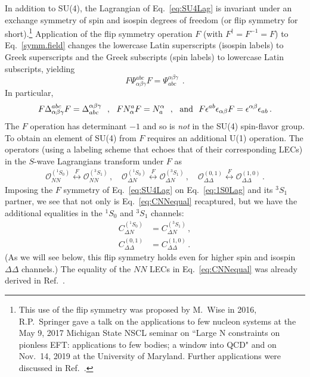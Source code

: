 \documentclass[nofootinbib, preprint, aps, prc, superscriptaddress,11pt]{revtex4-1}
\newcommand{\NN}{\ensuremath{N\!N}\xspace}
\newcommand{\oneS}{\ensuremath{{{}^{1}\!S_0}}\xspace}
\newcommand{\threeS}{\ensuremath{{{}^{3}\!S_1}}\xspace}
\newcommand\Swave{$S$-wave\xspace}
\newcommand{\calO}{\ensuremath{\mathcal{O}}}
\newcommand{\1}{\mathbbm{1}}
\newcommand{\CNDsing}{\ensuremath{C_{\Delta N}^{(^1 \! S_0)}}\xspace}
\newcommand{\CDDsing}{\ensuremath{C_{\Delta\Delta}^{(0,1)}}\xspace}
\newcommand{\ONNsing}{\ensuremath{\calO_{\NN}^{(^1 \! S_0)}}\xspace}
\newcommand{\ONDsing}{\ensuremath{\calO_{\Delta N}^{(^1 \! S_0)}}\xspace}
\newcommand{\CNDtrip}{\ensuremath{C_{\Delta N}^{(^3 \! S_1)}}\xspace}
\newcommand{\CDDtrip}{\ensuremath{C_{\Delta\Delta}^{(1,0)}}\xspace}
\newcommand{\ONNtrip}{\ensuremath{\calO_{\NN}^{(^3 \! S_1)}}\xspace}
\newcommand{\ONDtrip}{\ensuremath{\calO_{\Delta N}^{(^3 \! S_1)}}\xspace}
\newcommand{\DD}{\ensuremath{\Delta\Delta}\xspace}
\begin{document}
In addition to SU(4), the Lagrangian of Eq.~\ref{eq:SU4Lag} is invariant under an exchange symmetry of spin and isospin degrees of freedom (or flip symmetry for short).\footnote{This use of the flip symmetry was proposed by M.~Wise in 2016, R.P.~Springer gave a talk on the applications to few nucleon systems at the May 9, 2017  Michigan State NSCL seminar on ``Large N constraints on pionless EFT: applications to few bodies;
a window into QCD" and on Nov.~14, 2019 at  the University of Maryland.  Further applications were discussed in Ref.~\cite{Lee_2021}.}
Application of the flip symmetry operation $F$ (with $F^\dagger = F^{-1}=F$) to Eq.~\ref{symm.field} changes the lowercase Latin superscripts (isospin labels) to Greek superscripts and the Greek subscripts (spin labels) to lowercase Latin subscripts, yielding
\begin{equation}
F \Psi^{ abc }_{\alpha \beta \gamma}F=\Psi^{ \alpha \beta \gamma }_{abc} \ \ .
\end{equation}
In particular,
\begin{equation}
\label{bil}
 F \Delta^{abc}_{\alpha \beta \gamma}  F=\Delta_{abc}^{\alpha \beta \gamma} \ \ , \ \ F N^a_\alpha F  =N^\alpha_a \ \ , \ \  {\rm and} \ \ F \epsilon^{ab} \epsilon_{\alpha \beta} F = \epsilon^{\alpha \beta} \epsilon_{ab} \, .
\end{equation}
The $F$ operation has determinant $-1$ and so is \emph{not} in the SU(4) spin-flavor group.
To obtain an element of SU(4) from $F$ requires an additional U(1) operation. 
The operators (using a labeling scheme that echoes that of their corresponding LECs) in the \Swave Lagrangians transform under $F$ as 
\begin{align}
    \ONNsing \overset{F}{\longleftrightarrow} \ONNtrip \, , \quad \ONDsing \overset{F}{\longleftrightarrow} \ONDtrip\, , \quad  \calO_{\DD}^{(0,1)} \overset{F}{\longleftrightarrow} \calO_{\DD}^{(1,0)}\, .
\end{align}
Imposing the $F$ symmetry of Eq.~\eqref{eq:SU4Lag} on Eq.~\eqref{eq:1S0Lag} and its \threeS partner, we see that not only is Eq.~\eqref{eq:CNNequal} recaptured, but we have the additional equalities in the \oneS and \threeS channels: 
\begin{align}
\label{eq:CNDequal}    
    \CNDsing & = \CNDtrip  \, , \\
\label{eq:CDDequal}    
    \CDDsing & = \CDDtrip \, .
\end{align}
(As we will see below, this flip symmetry holds even for higher spin and isospin \DD channels.)
The equality of the \NN LECs in Eq.~\eqref{eq:CNNequal}  was already derived in Ref.~\cite{Kaplan:1995yg}.
\end{document}
